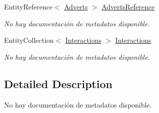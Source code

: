\begin{DoxyCompactItemize}
Entity\-Reference$<$ \hyperlink{class_microsoft_1_1_samples_1_1_kinect_1_1_basic_interactions_1_1_adverts}{Adverts} $>$ \hyperlink{class_microsoft_1_1_samples_1_1_kinect_1_1_basic_interactions_1_1_advert_campaign_details_ae956a5990ca34447a88074a63cfe686e}{Adverts\-Reference}
\begin{DoxyCompactList}\small\item\em No hay documentación de metadatos disponible. \end{DoxyCompactList}\item 
Entity\-Collection$<$ \hyperlink{class_microsoft_1_1_samples_1_1_kinect_1_1_basic_interactions_1_1_interactions}{Interactions} $>$ \hyperlink{class_microsoft_1_1_samples_1_1_kinect_1_1_basic_interactions_1_1_advert_campaign_details_aca7737ca065a3a0aec9182fe7e00e35f}{Interactions}
\begin{DoxyCompactList}\small\item\em No hay documentación de metadatos disponible. \end{DoxyCompactList}\end{DoxyCompactItemize}


\subsection{Detailed Description}
No hay documentación de metadatos disponible. 



